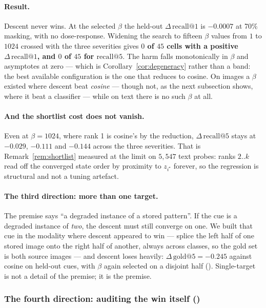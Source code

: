 \paragraph{Result.} Descent never wins. At the selected $\beta$ the held-out
$\Delta\,\mathrm{recall}@1$ is $-0.0007$  at 70\% masking, with no
dose-response. Widening the search to fifteen $\beta$ values from $1$ to $1024$ crossed with
the three severities gives \textbf{$0$ of $45$ cells with a positive
$\Delta\,\mathrm{recall}@1$, and $0$ of $45$ for $\mathrm{recall}@5$}. The harm falls
monotonically in $\beta$ and asymptotes at zero --- which is Corollary~\ref{cor:degeneracy}
rather than a band: the best available configuration is the one that reduces to cosine. On
images a $\beta$ existed where descent beat \emph{cosine} --- though not, as the next
subsection shows, where it beat a classifier --- while on text there is no such $\beta$ at
all.

\paragraph{And the shortlist cost does not vanish.} Even at $\beta = 1024$, where rank 1 is
cosine's by the reduction, $\Delta\,\mathrm{recall}@5$ stays at $-0.029$, $-0.111$ and
$-0.144$ across the three severities. That is Remark~\ref{rem:shortlist} measured at the
limit on $5{,}547$ text probes: ranks $2..k$ read off the converged state order by proximity
to $z_{i^\star}$ forever, so the regression is structural and not a tuning artefact.

\paragraph{The third direction: more than one target.} The premise says ``a degraded
instance of a stored pattern''. If the cue is a degraded instance of \emph{two}, the descent
must still converge on one. We built that cue in the modality where descent appeared to win
--- splice
the left half of one stored image onto the right half of another, always across classes, so
the gold set is both source images --- and descent loses heavily: $\Delta\,\mathrm{gold}@5 =
-0.245$  against cosine on held-out cues, with $\beta$ again selected on
a disjoint half (). Single-target is not a detail of the premise; it is the
premise.

\subsubsection*{The fourth direction: auditing the win itself ()}

